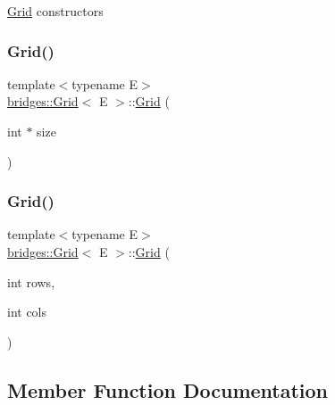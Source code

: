 \mbox{\hyperlink{classbridges_1_1_grid}{Grid}} constructors \mbox{\label{classbridges_1_1_grid_ad5c6c5e87eb40446ac794c5479937f87}} 
\subsubsection{\texorpdfstring{Grid()}{Grid()}\hspace{0.1cm}{\footnotesize\ttfamily [2/3]}}
{\footnotesize\ttfamily template$<$typename E$>$ \\
\mbox{\hyperlink{classbridges_1_1_grid}{bridges\+::\+Grid}}$<$ E $>$\+::\mbox{\hyperlink{classbridges_1_1_grid}{Grid}} (\begin{DoxyParamCaption}\item[{int $\ast$}]{size }\end{DoxyParamCaption})\hspace{0.3cm}{\ttfamily [inline]}}

\mbox{\label{classbridges_1_1_grid_af8bb9244c4c713f2325af6d4754ad1e9}} 
\subsubsection{\texorpdfstring{Grid()}{Grid()}\hspace{0.1cm}{\footnotesize\ttfamily [3/3]}}
{\footnotesize\ttfamily template$<$typename E$>$ \\
\mbox{\hyperlink{classbridges_1_1_grid}{bridges\+::\+Grid}}$<$ E $>$\+::\mbox{\hyperlink{classbridges_1_1_grid}{Grid}} (\begin{DoxyParamCaption}\item[{int}]{rows,  }\item[{int}]{cols }\end{DoxyParamCaption})\hspace{0.3cm}{\ttfamily [inline]}}



\subsection{Member Function Documentation}
\mbox{\label{classbridges_1_1_grid_aab69e77d9e1a51eabcf29c9c229cd35f}} 
